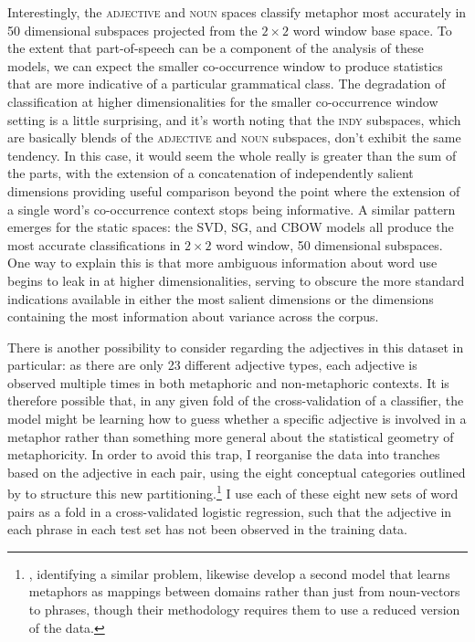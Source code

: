 Interestingly, the \textsc{adjective} and \textsc{noun} spaces classify metaphor most accurately in 50 dimensional subspaces projected from the $2 \times 2$ word window base space.  To the extent that part-of-speech can be a component of the analysis of these models, we can expect the smaller co-occurrence window to produce statistics that are more indicative of a particular grammatical class.  The degradation of classification at higher dimensionalities for the smaller co-occurrence window setting is a little surprising, and it's worth noting that the \textsc{indy} subspaces, which are basically blends of the \textsc{adjective} and \textsc{noun} subspaces, don't exhibit the same tendency.  In this case, it would seem the whole really is greater than the sum of the parts, with the extension of a concatenation of independently salient dimensions providing useful comparison beyond the point where the extension of a single word's co-occurrence context stops being informative.  A similar pattern emerges for the static spaces: the \textsc{SVD}, \textsc{SG}, and \textsc{CBOW} models all produce the most accurate classifications in $2 \times 2$ word window, 50 dimensional subspaces.  One way to explain this is that more ambiguous information about word use begins to leak in at higher dimensionalities, serving to obscure the more standard indications available in either the most salient dimensions or the dimensions containing the most information about variance across the corpus.

There is another possibility to consider regarding the adjectives in this dataset in particular: as there are only 23 different adjective types, each adjective is observed multiple times in both metaphoric and non-metaphoric contexts.  It is therefore possible that, in any given fold of the cross-validation of a classifier, the model might be learning how to guess whether a specific adjective is involved in a metaphor rather than something more general about the statistical geometry of metaphoricity.  In order to avoid this trap, I reorganise the data into tranches based on the adjective in each pair, using the eight conceptual categories outlined by \cite{GutierrezEA2016} to structure this new partitioning.\footnote{\cite{GutierrezEA2016}, identifying a similar problem, likewise develop a second model that learns metaphors as mappings between domains rather than just from noun-vectors to phrases, though their methodology requires them to use a reduced version of the data.}  I use each of these eight new sets of word pairs as a fold in a cross-validated logistic regression, such that the adjective in each phrase in each test set has not been observed in the training data.

